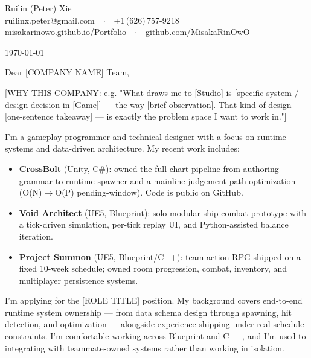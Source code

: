 \documentclass[letterpaper,11pt]{article}
\begin{document}
\pagestyle{empty}

Ruilin (Peter) Xie\\
ruilinx.peter@gmail.com\ \ $\cdot$\ \ +1\,(626)\,757-9218\\
\href{https://misakarinowo.github.io/Portfolio}{misakarinowo.github.io/Portfolio}\ \ $\cdot$\ \
\href{https://github.com/MisakaRinOwO}{github.com/MisakaRinOwO}

\today

Dear [COMPANY NAME] Team,

[WHY THIS COMPANY: e.g. "What draws me to [Studio] is [specific system / design decision
in [Game]] — the way [brief observation]. That kind of design — [one-sentence takeaway] —
is exactly the problem space I want to work in."]

I'm a gameplay programmer and technical designer with a focus on runtime systems and
data-driven architecture. My recent work includes:

\begin{itemize}
  \setlength\itemsep{2pt}
  \item \textbf{CrossBolt} (Unity, C\#): owned the full chart pipeline from authoring grammar
    to runtime spawner and a mainline judgement-path optimization
    (O(N)$\rightarrow$O(P) pending-window). Code is public on GitHub.
  \item \textbf{Void Architect} (UE5, Blueprint): solo modular ship-combat prototype with a
    tick-driven simulation, per-tick replay UI, and Python-assisted balance iteration.
  \item \textbf{Project Summon} (UE5, Blueprint/C++): team action RPG shipped on a fixed
    10-week schedule; owned room progression, combat, inventory, and multiplayer
    persistence systems.
\end{itemize}

I'm applying for the [ROLE TITLE] position. My background covers end-to-end runtime
system ownership — from data schema design through spawning, hit detection, and
optimization — alongside experience shipping under real schedule constraints. I'm
comfortable working across Blueprint and C++, and I'm used to integrating with
teammate-owned systems rather than working in isolation.
\end{document}

